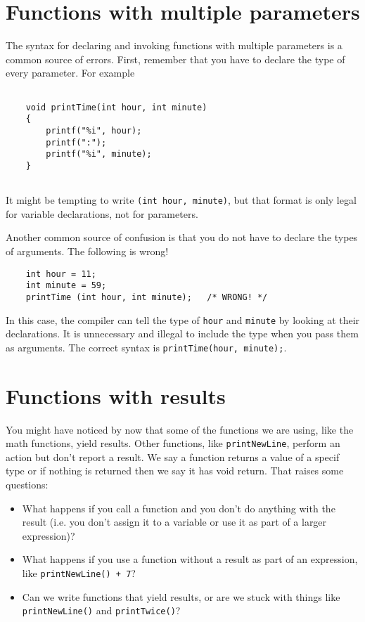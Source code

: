 \section {Functions with multiple parameters}

The syntax for declaring and invoking functions with multiple
parameters is a common source of errors.  First, remember
that you have to declare the type of every parameter.  For
example

\begin{verbatim}

    void printTime(int hour, int minute) 
    {
        printf("%i", hour);
        printf(":");
        printf("%i", minute);
    }
  
\end{verbatim}
%
It might be tempting to write {\tt (int hour, minute)}, but
that format is only legal for variable declarations, not
for parameters.

Another common source of confusion is that you do not have
to declare the types of arguments.  The following is wrong!

\begin{verbatim}
    int hour = 11;
    int minute = 59;
    printTime (int hour, int minute);   /* WRONG! */
\end{verbatim}
%
In this case, the compiler can tell the type of {\tt hour}
and {\tt minute} by looking at their declarations.  It is
unnecessary and illegal to include the type when you pass them
as arguments.  The correct
syntax is {\tt printTime(hour, minute);}.

\section {Functions with results}

You might have noticed by now that some of the functions we are using,
like the math functions, yield results.  Other functions,
like {\tt printNewLine}, perform an action but
don't report a result. We say a function returns a value of a specif type or if nothing is returned then we say it has void return.
That raises some questions:

\begin{itemize}

\item What happens if you call a function and you don't
do anything with the result (i.e. you don't assign it to
a variable or use it as part of a larger expression)?

\item What happens if you use a function without a result as part
of an expression, like {\tt printNewLine() + 7}?

\item Can we write functions that yield results, or are we
stuck with things like {\tt printNewLine()} and {\tt printTwice()}?

\end{itemize}

